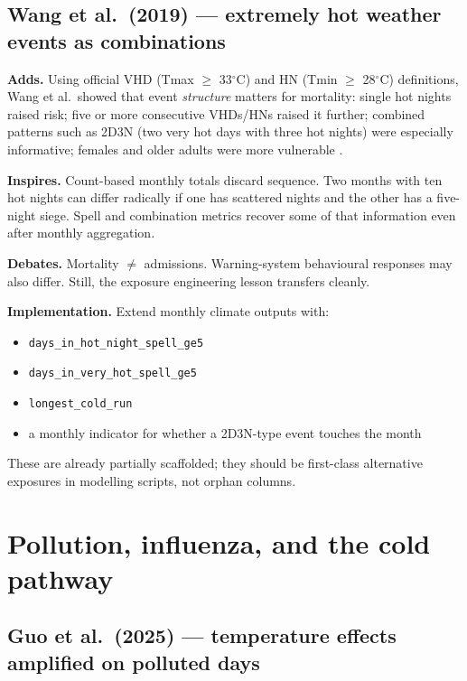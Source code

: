 \documentclass[11pt]{article}
\newcommand{\adds}{\textcolor{green!40!black}{\textbf{Adds.}}}
\newcommand{\inspires}{\textcolor{blue!55!black}{\textbf{Inspires.}}}
\newcommand{\debates}{\textcolor{orange!70!black}{\textbf{Debates.}}}
\newcommand{\impl}{\textcolor{purple!55!black}{\textbf{Implementation.}}}
\begin{document}
\subsection{Wang et al.\ (2019) --- extremely hot weather events as combinations}

\adds{} Using official VHD (Tmax $\ge$ 33$^\circ$C) and HN (Tmin $\ge$ 28$^\circ$C)
definitions, Wang et al.\ showed that event \emph{structure} matters for mortality:
single hot nights raised risk; five or more consecutive VHDs/HNs raised it further;
combined patterns such as 2D3N (two very hot days with three hot nights) were
especially informative; females and older adults were more vulnerable
\citep{wang2019ehwe}.

\inspires{} Count-based monthly totals discard sequence. Two months with ten hot
nights can differ radically if one has scattered nights and the other has a
five-night siege. Spell and combination metrics recover some of that information
even after monthly aggregation.

\debates{} Mortality $\neq$ admissions. Warning-system behavioural responses may
also differ. Still, the exposure engineering lesson transfers cleanly.

\impl{} Extend monthly climate outputs with:
\begin{itemize}
  \item \texttt{days\_in\_hot\_night\_spell\_ge5}
  \item \texttt{days\_in\_very\_hot\_spell\_ge5}
  \item \texttt{longest\_cold\_run}
  \item a monthly indicator for whether a 2D3N-type event touches the month
\end{itemize}
These are already partially scaffolded; they should be first-class alternative
exposures in modelling scripts, not orphan columns.

\section{Pollution, influenza, and the cold pathway}

\subsection{Guo et al.\ (2025) --- temperature effects amplified on polluted days}
\end{document}
